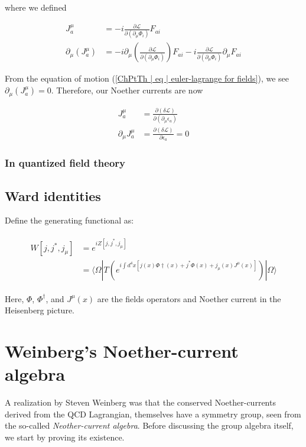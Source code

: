\documentclass[10pt]{report}
\begin{document}
	where we defined
	
	\begin{align}
		J_a^\mu &= -i\frac{\partial\mathcal{L}}{\partial(\partial_\mu\Phi_i)}F_{ai} \\
		\partial_\mu(J_a^\mu) &= -i\partial_\mu\left(\frac{\partial\mathcal{L}}{\partial(\partial_\mu\Phi_i)}\right)F_{ai} - i\frac{\partial\mathcal{L}}{\partial(\partial_\mu\Phi_i)}\partial_\mu F_{ai}
	\end{align}
	
	From the equation of motion (\ref{ChPtTh | eq | euler-lagrange for fields}), we see $\partial_\mu(J_a^\mu)=0$. Therefore, our Noether currents are now
	
	\begin{align}
		J_a^\mu &= \frac{\partial (\delta\mathcal{L})}{\partial(\partial_\mu\epsilon_a)} \\
		\partial_\mu J_a^\mu &= \frac{\partial (\delta\mathcal{L})}{\partial\epsilon_a} = 0
	\end{align}
	
	\subsubsection{In quantized field theory}
	
	\subsection{Ward identities}
	
	Define the generating functional as:
	
	\begin{align}
		\begin{split}
		W[j,j^*,j_\mu] &= e^{iZ[j,j^*,j_\mu]}\\
		&= \langle \Omega|T\left( e^{i\int d^4x\left[ j(x)\Phi\dagger(x) + j^*\Phi(x) + j_\mu(x)J^\mu(x) \right]} \right)| \Omega\rangle
		\end{split}
	\end{align}
	
	Here, $\Phi$, $\Phi^\dagger$, and $J^\mu(x)$ are the fields operators and Noether current in the Heisenberg picture.
	
	\section{Weinberg's Noether-current algebra}
	
	A realization by Steven Weinberg was that the conserved Noether-currents derived from the QCD Lagrangian, themselves have a symmetry group, seen from the so-called \emph{Neother-current algebra}. Before discussing the group algebra itself, we start by proving its existence.
	
\end{document}
